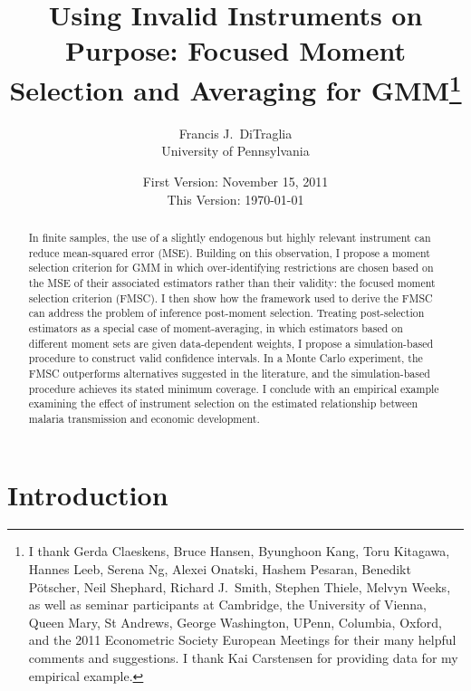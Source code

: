 \documentclass[12pt]{article}
\theoremstyle{definition}
\begin{document}
\title{Using Invalid Instruments on Purpose: Focused Moment Selection and Averaging for GMM\footnote{I thank Gerda Claeskens, Bruce Hansen, Byunghoon Kang, Toru Kitagawa, Hannes Leeb, Serena Ng, Alexei Onatski, Hashem Pesaran, Benedikt P\"{o}tscher, Neil Shephard,  Richard J.\ Smith, Stephen Thiele, Melvyn Weeks, as well as seminar participants at Cambridge, the University of Vienna, Queen Mary, St Andrews, George Washington, UPenn, Columbia, Oxford, and the 2011 Econometric Society European Meetings for their many helpful comments and suggestions. I thank Kai Carstensen for providing data for my empirical example.}}

\author{Francis J.\ DiTraglia \\ University of Pennsylvania}

\date{\normalsize First Version: November 15, 2011 \\ This Version: \today}

\maketitle 
\begin{abstract}
In finite samples, the use of a slightly endogenous but highly relevant instrument can reduce mean-squared error (MSE). Building on this observation, I propose a moment selection criterion for GMM in which over-identifying restrictions are chosen based on the MSE of their associated estimators rather than their validity: the focused moment selection criterion (FMSC). I then show how the framework used to derive the FMSC can address the problem of inference post-moment selection. Treating post-selection estimators as a special case of moment-averaging, in which estimators based on different moment sets are given data-dependent weights, I propose a simulation-based procedure to construct valid confidence intervals. In a Monte Carlo experiment, the FMSC outperforms alternatives suggested in the literature, and the simulation-based procedure achieves its stated minimum coverage. I conclude with an empirical example examining the effect of instrument selection on the estimated relationship between malaria transmission and economic development.
\end{abstract}




\section{Introduction}
\end{document}
